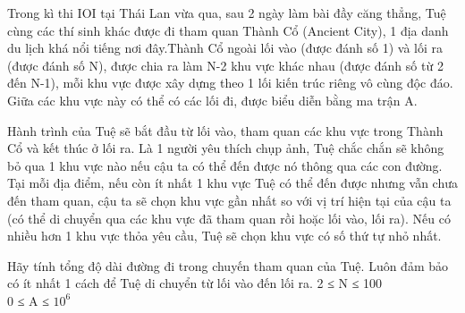 Trong kì thi IOI tại Thái Lan vừa qua, sau 2 ngày làm bài đầy căng thẳng, Tuệ cùng các thí sinh khác được đi tham quan Thành Cổ (Ancient City), 1 địa danh du lịch khá nổi tiếng nơi đây.Thành Cổ ngoài lối vào (được đánh số 1) và lối ra (được đánh số N), được chia ra làm N-2 khu vực khác nhau (được đánh số từ 2 đến N-1), mỗi khu vực được xây dựng theo 1 lối kiến trúc riêng vô cùng độc đáo. Giữa các khu vực này có thể có các lối đi, được biểu diễn bằng ma trận A.  

   Hành trình của Tuệ sẽ bắt đầu từ lối vào, tham quan các khu vực trong Thành Cổ và kết thúc ở lối ra. Là 1 người yêu thích chụp ảnh, Tuệ chắc chắn sẽ không bỏ qua 1 khu vực nào nếu cậu ta có thể đến được nó thông qua các con đường. Tại mỗi địa điểm, nếu còn ít nhất 1 khu vực Tuệ có thể đến được nhưng vẫn chưa đến tham quan, cậu ta sẽ chọn khu vực gần nhất so với vị trí hiện tại của cậu ta (có thể di chuyển qua các khu vực đã tham quan rồi hoặc lối vào, lối ra). Nếu có nhiều hơn 1 khu vực thỏa yêu cầu, Tuệ sẽ chọn khu vực có số thứ tự nhỏ nhất.  

   Hãy tính tổng độ dài đường đi trong chuyến tham quan của Tuệ. Luôn đảm bảo có ít nhất 1 cách để Tuệ di chuyển từ lối vào đến lối ra.
2 ≤ N ≤ 100   
\\   0 ≤ A ≤ $10^{6}$